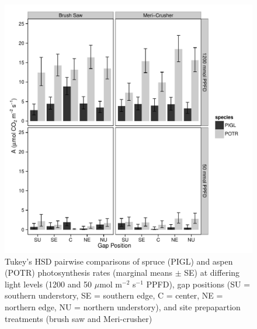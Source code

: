 \documentclass{article}\usepackage[]{graphicx}\usepackage[]{color}
\makeatletter
\def\maxwidth{ %
  \ifdim\Gin@nat@width>\linewidth
    \linewidth
  \else
    \Gin@nat@width
  \fi
}
\newenvironment{knitrout}{}{} %
\makeatother
\begin{document}
\begin{knitrout}
\color{fgcolor}\begin{figure}[]

\includegraphics[width=\maxwidth]{figure/A_plot} \caption[Tukey's HSD pairwise comparisons of spruce (PIGL) and aspen (POTR) photosynthesis rates (marginal means $\pm$ SE) at differing light levels (1200 and 50 $\mu$mol m$^{-2}$ s$^{-1}$ PPFD), gap positions (SU = southern understory, SE = southern edge, C = center, NE = northern edge, NU = northern understory), and site prepapartion treatments (brush saw and Meri-crusher)]{Tukey's HSD pairwise comparisons of spruce (PIGL) and aspen (POTR) photosynthesis rates (marginal means $\pm$ SE) at differing light levels (1200 and 50 $\mu$mol m$^{-2}$ s$^{-1}$ PPFD), gap positions (SU = southern understory, SE = southern edge, C = center, NE = northern edge, NU = northern understory), and site prepapartion treatments (brush saw and Meri-crusher)\label{fig:A_plot}}
\end{figure}


\end{knitrout}
\end{document}
